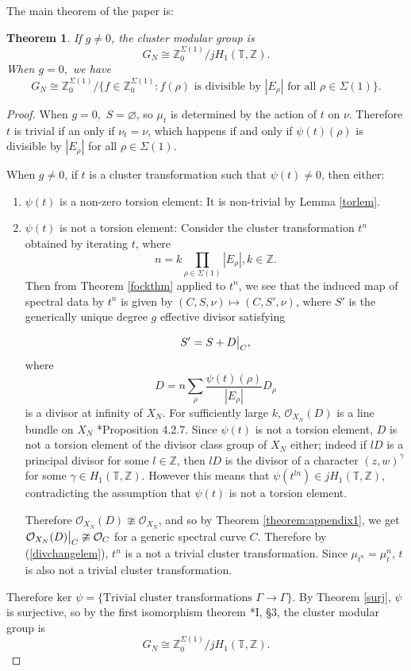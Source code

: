 \documentclass[11pt]{article} %
\newtheorem{theorem}{Theorem}[section]
\theoremstyle{definition}
\newcommand{\Z}{{\mathbb Z}}
\newcommand{\T}{{\mathbb T}}
\newcommand\restr[2]{{%
  \left.\kern-\nulldelimiterspace %
  #1 %
  \vphantom{\big|} %
  \right|_{#2} %
  }}
\newcommand{\ra}{\rightarrow}
\newcommand{\be}{\begin{equation}}
\newcommand{\ee}{\end{equation}}
\begin{document}
The main theorem of the paper is:

\begin{theorem}\label{maincor}
If $g \neq 0$, the cluster modular group is 
$$
G_N \cong \Z^{\Sigma(1)}_0/jH_1(\T,\Z).
$$
When $g=0,$ we have
$$G_N \cong \Z^{\Sigma(1)}_0/\{f \in \Z^{\Sigma(1)}_0:  f(\rho) \text{ is divisible by } |E_\rho|  \text{ for all }\rho \in \Sigma(1) \}.$$


\end{theorem}

\begin{proof}
When $g=0,$ $S=\varnothing$, so $\mu_t$ is determined by the action of $t$ on $\nu$. Therefore $t$ is trivial if an only if $\nu_t=\nu$, which happens if and only if $\psi(t)(\rho)$ is divisible by $|E_\rho|$ for all $\rho \in \Sigma(1)$.

When $g \neq 0$, if $t$ is a cluster transformation such that $\psi(t) \neq 0$, then either:
\begin{enumerate}
    \item $\psi(t)$ is a non-zero torsion element: It is non-trivial by Lemma \ref{torlem}.
    \item $\psi(t)$ is not a torsion element: Consider the cluster transformation $t^n$ obtained by iterating $t$, where 
    $$n=k \prod_{\rho \in \Sigma(1)} |E_\rho|, k \in \Z.$$
    Then from Theorem \ref{fockthm} applied to $t^n$, we see that the induced map of spectral data by $t^n$ is given by $(C,S,\nu) \mapsto (C,S',\nu)$, where $S'$ is the generically unique degree $g$ effective divisor satisfying 
    
\be \label{divchangelem}
S' = S+\restr{D}{C},\ee
where $$D=n \sum_\rho \frac{\psi(t)(\rho)}{|E_\rho|}D_\rho$$ is a divisor at infinity of $X_N$. For sufficiently large $k$, $\mathcal O_{X_N}(D)$ is a line bundle on $X_N$ \cite{CLS11}*{Proposition 4.2.7}. Since $\psi(t)$ is not a torsion element, $D$ is not a torsion element of the divisor class group of $X_N$ either; indeed if $l D$ is a principal divisor for some $l \in \Z$, then $lD$ is the divisor of a character $(z,w)^\gamma$ for some $\gamma \in H_1(\T,\Z)$. However this means that $\psi(t^{ln}) \in jH_1(\T,\Z)$, contradicting the assumption that $\psi(t)$ is not a torsion element.

Therefore $\mathcal O_{X_N}(D) \ncong \mathcal O_{X_N}$, and so by Theorem \ref{theorem:appendix1}, we get $\restr{\mathcal O_{X_N}(D)}{C} \ncong \mathcal O_C$ for a generic spectral curve $C$. Therefore by (\ref{divchangelem}), $t^n$ is a not a trivial cluster transformation. Since $\mu_{t^n} = \mu_t^n$, $t$ is also not a trivial cluster transformation.
\end{enumerate}
Therefore $\text{ker }\psi=\{\text{Trivial cluster transformations } \Gamma \ra \Gamma\}$. By Theorem \ref{surj}, $\psi$ is surjective, so by the first isomorphism theorem \cite{Lang}*{I, \S 3}, the cluster modular group is
$$
G_N \cong \Z^{\Sigma(1)}_0/jH_1(\T,\Z).
$$ 


\end{proof}
\end{document}
